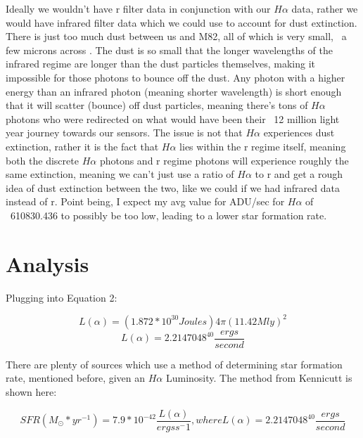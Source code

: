 \documentclass[modern]{aastex63}
\begin{document}
Ideally we wouldn't have r filter data in conjunction with our $H\alpha$ data, rather we would have infrared filter data which we could use to account for dust extinction. There is just too much dust between us and M82, all of which is very small, ~a few microns across . The dust is so small that the longer wavelengths of the infrared regime are longer than the dust particles themselves, making it impossible for those photons to bounce off the dust. Any photon with a higher energy than an infrared photon (meaning shorter wavelength) is short enough that it will scatter (bounce) off dust particles, meaning there's tons of $H\alpha$ photons who were redirected on what would have been their ~12 million light year journey towards our sensors. The issue is not that $H\alpha$ experiences dust extinction, rather it is the fact that $H\alpha$ lies within the r regime itself, meaning both the discrete $H\alpha$ photons and r regime photons will experience roughly the same extinction, meaning we can't just use a ratio of $H\alpha$ to r and get a rough idea of dust extinction between the two, like we could if we had infrared data instead of r. Point being, I expect my avg value for ADU/sec for $H\alpha$ of ~610830.436 to possibly be too low, leading to a lower star formation rate.

\bigskip
\section{Analysis}
Plugging into Equation 2:

\begin{equation}
L(\alpha) = (1.872 * 10^{30} Joules) 4\pi (11.42 Mly)^2
\end{equation}
\begin{equation}
L(\alpha) = 2.2147048^{40} \frac{ergs}{second}
\end{equation}

There are plenty of sources which use a method of determining star formation rate, mentioned before, given an $H\alpha$ Luminosity. The method from Kennicutt is shown here\citep{1994ApJ...435...22K}:

\begin{equation}\label{'Equation 7'}
SFR(M_{\odot} * yr^{-1}) = 7.9 * 10^{-42} \frac{L(\alpha)}{ergs s^-{1}}, 

where L(\alpha) = 2.2147048^{40} \frac{ergs}{second} \end{equation} 
\end{document}
